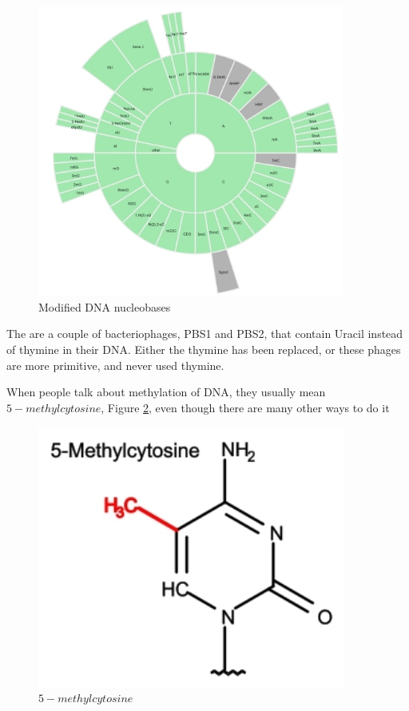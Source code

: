 \documentclass[]{article}
\begin{document}
\begin{figure}[H]
	\caption{Modified DNA nucleobases } \label{fig:ModifiedDNA_Nucleobases} 
	\includegraphics[width=0.9\textwidth]{ModifiedDNA_Nucleobases}
\end{figure}

The are a couple of bacteriophages, PBS1 and PBS2, that contain Uracil instead of thymine in their DNA\cite{hemphill1975bacteriophages}. Either the thymine has been replaced, or these phages are more primitive, and never used thymine.

When people talk about methylation of DNA, they usually mean $5-methylcytosine$, Figure \ref{fig:5methylcytosine}, even though there are many other ways to do it
\begin{figure}[H]
	\caption{$5-methylcytosine$ } \label{fig:5methylcytosine} 
	\includegraphics[width=0.9\textwidth]{5-methylcytosine}
\end{figure}
\end{document}
